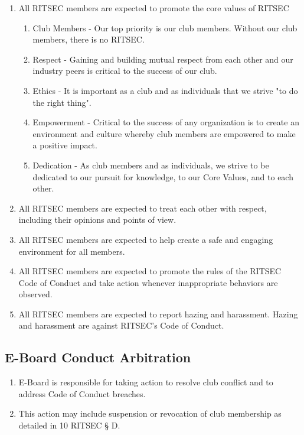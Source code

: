 \documentclass{article}
\begin{document}
\begin{enumerate}
  \item All RITSEC members are expected to promote the core values of RITSEC
  \begin{enumerate}
    \item Club Members - Our top priority is our club members. Without our club
      members, there is no RITSEC.
    \item Respect - Gaining and building mutual respect from each other and our
      industry peers is critical to the success of our club.
    \item Ethics - It is important as a club and as individuals that we strive
      "to do the right thing".
    \item Empowerment - Critical to the success of any organization is to
      create an environment and culture whereby club members are empowered to
      make a positive impact.
    \item Dedication - As club members and as individuals, we strive to be
      dedicated to our pursuit for knowledge, to our Core Values, and to each
      other.
  \end{enumerate}
  \item All RITSEC members are expected to treat each other with respect,
    including their opinions and points of view.
  \item All RITSEC members are expected to help create a safe and engaging
    environment for all members.
  \item All RITSEC members are expected to promote the rules of the RITSEC Code
    of Conduct and take action whenever inappropriate behaviors are observed.
  \item All RITSEC members are expected to report hazing and harassment. Hazing
    and harassment are against RITSEC’s Code of Conduct.
\end{enumerate}

\subsection{E-Board Conduct Arbitration}

\begin{enumerate}
  \item E-Board is responsible for taking action to resolve club conflict and
    to address Code of Conduct breaches.
  \item This action may include suspension or revocation of club membership as
    detailed in 10 RITSEC § D.
\end{enumerate}
\end{document}

